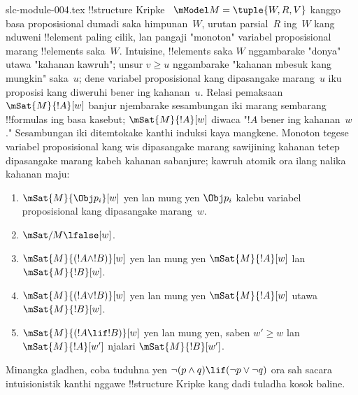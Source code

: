 \begin{filecontents*}[overwrite]{slc-module-004.tex}
!!{structure} Kripke
~$\mModel M = \tuple{W, R, V}$
kanggo basa proposisional
dumadi saka himpunan~$W$,
urutan parsial~$R$
ing~$W$ kang nduweni
!!{element} paling cilik,
lan pangaji "monoton"
variabel proposisional
marang !!{element}s
saka~$W$. Intuisine,
!!{element}s saka $W$
nggambarake "donya"
utawa "kahanan
kawruh"; unsur
$v \geq u$ nggambarake
"kahanan mbesuk kang
mungkin" saka~$u$;
dene variabel
proposisional kang
dipasangake marang~$u$
iku proposisi kang
diweruhi bener
ing kahanan~$u$.
Relasi pemaksaan
$\mSat{M}{!A}[w]$
banjur njembarake
sesambungan iki
marang sembarang
!!{formula}s ing
basa kasebut;
$\mSat{M}{!A}[w]$
diwaca "$!A$ bener
ing kahanan~$w$."
Sesambungan iki
ditemtokake kanthi
induksi kaya mangkene. Monoton tegese variabel proposisional kang wis dipasangake marang sawijining kahanan tetep dipasangake marang kabeh kahanan sabanjure; kawruh atomik ora ilang nalika kahanan maju:
\begin{enumerate}
\item $\mSat{M}{\Obj p_i}[w]$ yen lan mung yen
  $\Obj p_i$ kalebu variabel proposisional
  kang dipasangake marang~$w$.
\item $\mSat/{M}{\lfalse}[w]$.
\item $\mSat{M}{(!A \land !B)}[w]$ yen lan mung yen
  $\mSat{M}{!A}[w]$ lan $\mSat{M}{!B}[w]$.
\item $\mSat{M}{(!A \lor !B)}[w]$ yen lan mung yen
  $\mSat{M}{!A}[w]$ utawa $\mSat{M}{!B}[w]$.
\item $\mSat{M}{(!A \lif !B)}[w]$ yen lan mung yen,
  saben $w' \geq w$ lan
  $\mSat{M}{!A}[w']$ njalari
  $\mSat{M}{!B}[w']$.
\end{enumerate}
Minangka gladhen, coba
tuduhna yen $\lnot (p \land q) \lif
(\lnot p \lor \lnot q)$
ora sah sacara intuisionistik
kanthi nggawe
!!{structure} Kripke
kang dadi tuladha
kosok baline.


\end{filecontents*}

